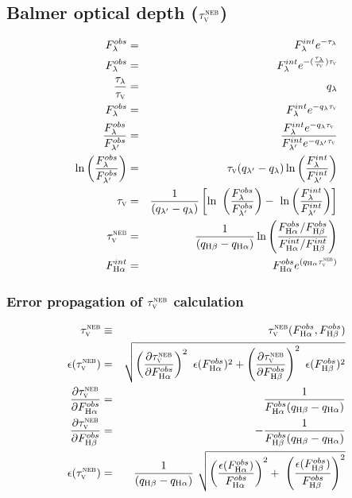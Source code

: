 \documentclass[a4paper,11pt]{article}
\begin{document}
\subsection{Balmer optical depth ($\tau_{\mathrm{\textsc{v}}}^{\mathrm{\textsc{neb}}}$)}
\begin{eqnarray}
	F_\lambda^{obs} &=& F_\lambda^{int} e^{-\tau_\lambda} \\
	F_\lambda^{obs} &=& F_\lambda^{int} e^{-(\frac{\tau_\lambda}{\tauV}) \tauV} \\
	\frac{\tau_\lambda}{\tauV} &=& q_\lambda \\
	F_\lambda^{obs} &=& F_\lambda^{int} e^{-q_\lambda \tauV} \\
	\frac{F_\lambda^{obs}}{F_{\lambda^\prime}^{obs}} &=& \
\frac{F_\lambda^{int} e^{-q_\lambda \tauV}}{F_{\lambda^\prime}^{int} e^{-q_{\lambda^\prime} \tauV}} \\
	\ln \left(\frac{F_\lambda^{obs}}{F_{\lambda^\prime}^{obs}}\right) &=& \
\tauV (q_{\lambda^\prime} - q_\lambda) \ln \left(\frac{F_\lambda^{int}}{F_{\lambda^\prime}^{int}}\right) \\
	\tauV &=& \frac{1}{(q_{\lambda^\prime} - q_\lambda)} \left[\ln \ 
\left(\frac{F_\lambda^{obs}}{F_{\lambda^\prime}^{obs}}\right) - \
\ln \left(\frac{F_\lambda^{int}}{F_{\lambda^\prime}^{int}}\right)\right] \\
	\tauVN &=& \frac{1}{(q_{\Hbeta} - q_{\Halpha})} \ln \left( \frac{ F_{\Halpha}^{obs} / F_{\Hbeta}^{obs}}{F_{\Halpha}^{int} / F_{\Hbeta}^{int}} \right) \\
	F_{\Halpha}^{int} &=& F_{\Halpha}^{obs} e^{(q_{\Halpha} \tauVN)}
\end{eqnarray}

\subsubsection{Error propagation of $\tau_{\mathrm{\textsc{v}}}^{\mathrm{\textsc{neb}}}$ calculation}
\begin{eqnarray}
	\tauVN &\equiv& \tauVN(F_{\Halpha}^{obs}, F_{\Hbeta}^{obs}) \\
	\epsilon (\tauVN) &=& \sqrt{\left(\del{\tauVN}{F_{\Halpha}^{obs}}\right)^2 \
\epsilon (F_{\Halpha}^{obs})^2 + \left(\del{\tauVN}{F_{\Hbeta}^{obs}}\right)^2 \
\epsilon (F_{\Hbeta}^{obs})^2 } \\
	\del{\tauVN}{F_{\Halpha}^{obs}} &=& \frac{1}{F_{\Halpha}^{obs} (q_{\Hbeta} - q_{\Halpha})} \\
	\del{\tauVN}{F_{\Hbeta}^{obs}} &=& - \frac{1}{F_{\Hbeta}^{obs} (q_{\Hbeta} - q_{\Halpha})} \\
	\epsilon (\tauVN) &=& \frac{1}{(q_{\Hbeta} - q_{\Halpha})} \
\sqrt{\left(\frac{\epsilon (F_{\Halpha}^{obs})}{F_{\Halpha}^{obs}}\right)^2 + \
\left(\frac{\epsilon (F_{\Hbeta}^{obs})}{F_{\Hbeta}^{obs}}\right)^2 }
\end{eqnarray}
\end{document}
